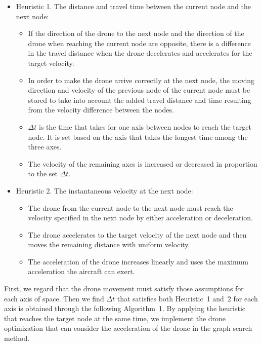 \documentclass[journal]{./template/IEEEtran}
\begin{document}
\begin{itemize}
\item Heuristic 1. The distance and travel time between the current node and the next node:
  \begin{itemize}
      \item If the direction of the drone to the next node and the direction of the drone when reaching the current node are opposite, there is a difference in the travel distance when the drone decelerates and accelerates for the target velocity.
      \item In order to make the drone arrive correctly at the next node, the moving direction and velocity of the previous node of the current node must be stored to take into account the added travel distance and time resulting from the velocity difference between the nodes.
      \item $\Delta t$ is the time that takes for one axis between nodes to reach the target node. It is set based on the axis that takes the longest time among the three axes.
      \item The velocity of the remaining axes is increased or decreased in proportion to the set $\Delta t$.
  \end{itemize}
\item Heuristic 2. The instantaneous velocity at the next node:
  \begin{itemize}
      \item The drone from the current node to the next node must reach the velocity specified in the next node by either acceleration or deceleration.
      \item The drone accelerates to the target velocity of the next node and then moves the remaining distance with uniform velocity.
      \item The acceleration of the drone increases linearly and uses the maximum acceleration the aircraft can exert. 
  \end{itemize}
\end{itemize}

First, we regard that the drone movement must satisfy those assumptions for each axis of space.
Then we find $\Delta t$ that satisfies both Heuristic~1 and~2 for each axis is obtained through the following Algorithm~1. By applying the heuristic that reaches the target node at the same time, we implement the drone optimization that can consider the acceleration of the drone in the graph search method.
\end{document}
